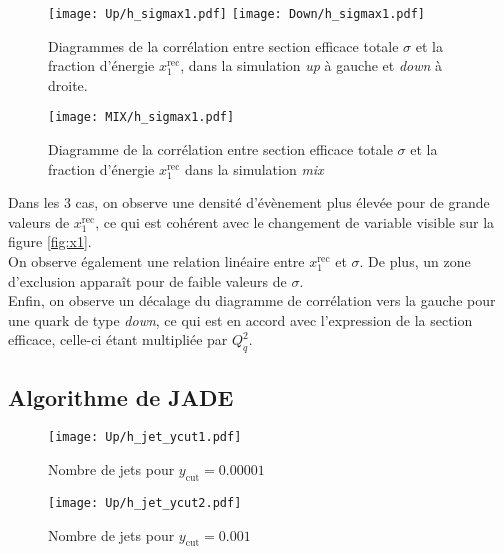 \documentclass[a4paper]{article} %
\numberwithin{equation}{section} %
\theoremstyle{definition}
\theoremstyle{remark}
\theoremstyle{plain}%
\theoremstyle{style_exemple}
\begin{document}
\begin{figure}[H]
    \centering
    \texttt{[image: Up/h\_sigmax1.pdf]}
    \texttt{[image: Down/h\_sigmax1.pdf]}
    \begin{minipage}{12cm}
        \caption{Diagrammes de la corrélation entre section efficace totale $\sigma$ et la fraction d'énergie $x^\text{rec}_1$, dans la simulation \textit{up} à gauche et \textit{down} à droite.}
        \label{fig:sigmax1}
    \end{minipage}
    \centering
    \texttt{[image: MIX/h\_sigmax1.pdf]}
    \caption{Diagramme de la corrélation entre section efficace totale $\sigma$ et la fraction d'énergie $x^\text{rec}_1$ dans la simulation \textit{mix}}
    \label{fig:sigmax1_combine}
\end{figure}
Dans les 3 cas, on observe une densité d'évènement plus élevée pour de grande valeurs de $x^\text{rec}_1$, ce qui est cohérent avec le changement de variable visible sur la figure \ref{fig:x1}.\\
On observe également une relation linéaire entre $x^\text{rec}_1$ et $\sigma$. De plus, un zone d'exclusion apparaît pour de faible valeurs de $\sigma$.\\
Enfin, on observe un décalage du diagramme de corrélation vers la gauche pour une quark de type \textit{down}, ce qui est en accord avec l'expression de la section efficace, celle-ci étant multipliée par $Q_q^2$.

\newpage
\subsection{Algorithme de JADE}

\begin{figure}[H]
    \centering
    \texttt{[image: Up/h\_jet\_ycut1.pdf]}
    \begin{minipage}{5cm}
        \caption{Nombre de jets pour $y_\text{cut} = 0.00001$}
        \label{fig:enter-label}
    \end{minipage}
\end{figure}

\endminipage
\vspace{.0333\textwidth}

\begin{figure}[H]
    \centering
    \texttt{[image: Up/h\_jet\_ycut2.pdf]}
    \begin{minipage}{5cm}
        \caption{Nombre de jets pour $y_\text{cut} = 0.001$}
        \label{fig:enter-label}
    \end{minipage}
\end{figure}
\end{document}

